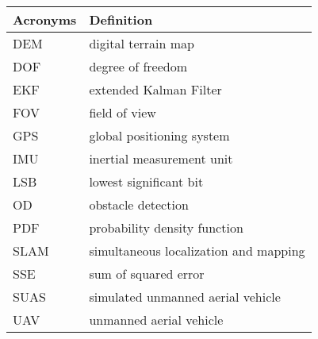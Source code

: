 \begin{center}
\begin{longtable}{ll}
  \hline
  \textbf{Acronyms} & \textbf{Definition} \\
  \hline\hline

DEM     &       digital terrain map\\
DOF     &       degree of freedom \\
EKF     &       extended Kalman Filter \\
FOV	&	field of view	\\
GPS     &       global positioning system \\
IMU     &       inertial measurement unit \\
LSB     &       lowest significant bit  \\
OD      &       obstacle detection \\
PDF     &       probability density function \\
SLAM    &       simultaneous localization and mapping \\
SSE     &       sum of squared error\\
SUAS    &       simulated unmanned aerial vehicle \\
UAV     &       unmanned aerial vehicle\\
  \hline
\end{longtable}
\end{center}
